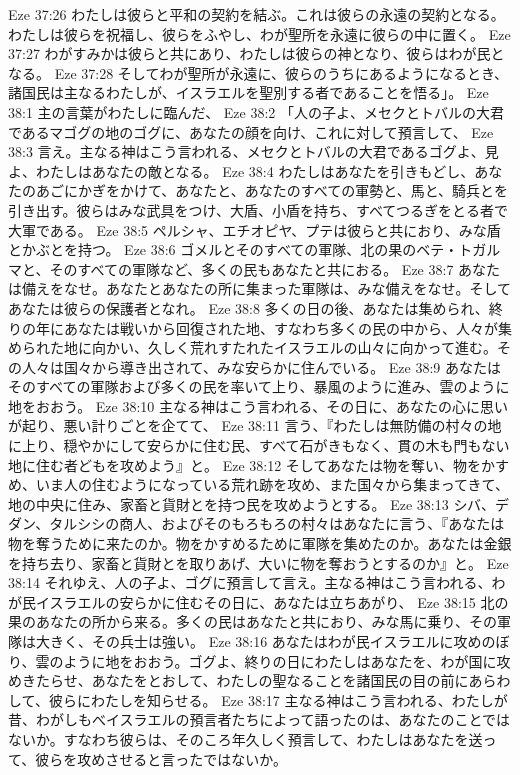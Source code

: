 Eze 37:26  わたしは彼らと平和の契約を結ぶ。これは彼らの永遠の契約となる。わたしは彼らを祝福し、彼らをふやし、わが聖所を永遠に彼らの中に置く。
Eze 37:27  わがすみかは彼らと共にあり、わたしは彼らの神となり、彼らはわが民となる。
Eze 37:28  そしてわが聖所が永遠に、彼らのうちにあるようになるとき、諸国民は主なるわたしが、イスラエルを聖別する者であることを悟る」。
Eze 38:1  主の言葉がわたしに臨んだ、
Eze 38:2  「人の子よ、メセクとトバルの大君であるマゴグの地のゴグに、あなたの顔を向け、これに対して預言して、
Eze 38:3  言え。主なる神はこう言われる、メセクとトバルの大君であるゴグよ、見よ、わたしはあなたの敵となる。
Eze 38:4  わたしはあなたを引きもどし、あなたのあごにかぎをかけて、あなたと、あなたのすべての軍勢と、馬と、騎兵とを引き出す。彼らはみな武具をつけ、大盾、小盾を持ち、すべてつるぎをとる者で大軍である。
Eze 38:5  ペルシャ、エチオピヤ、プテは彼らと共におり、みな盾とかぶとを持つ。
Eze 38:6  ゴメルとそのすべての軍隊、北の果のベテ・トガルマと、そのすべての軍隊など、多くの民もあなたと共におる。
Eze 38:7  あなたは備えをなせ。あなたとあなたの所に集まった軍隊は、みな備えをなせ。そしてあなたは彼らの保護者となれ。
Eze 38:8  多くの日の後、あなたは集められ、終りの年にあなたは戦いから回復された地、すなわち多くの民の中から、人々が集められた地に向かい、久しく荒れすたれたイスラエルの山々に向かって進む。その人々は国々から導き出されて、みな安らかに住んでいる。
Eze 38:9  あなたはそのすべての軍隊および多くの民を率いて上り、暴風のように進み、雲のように地をおおう。
Eze 38:10  主なる神はこう言われる、その日に、あなたの心に思いが起り、悪い計りごとを企てて、
Eze 38:11  言う、『わたしは無防備の村々の地に上り、穏やかにして安らかに住む民、すべて石がきもなく、貫の木も門もない地に住む者どもを攻めよう』と。
Eze 38:12  そしてあなたは物を奪い、物をかすめ、いま人の住むようになっている荒れ跡を攻め、また国々から集まってきて、地の中央に住み、家畜と貨財とを持つ民を攻めようとする。
Eze 38:13  シバ、デダン、タルシシの商人、およびそのもろもろの村々はあなたに言う、『あなたは物を奪うために来たのか。物をかすめるために軍隊を集めたのか。あなたは金銀を持ち去り、家畜と貨財とを取りあげ、大いに物を奪おうとするのか』と。
Eze 38:14  それゆえ、人の子よ、ゴグに預言して言え。主なる神はこう言われる、わが民イスラエルの安らかに住むその日に、あなたは立ちあがり、
Eze 38:15  北の果のあなたの所から来る。多くの民はあなたと共におり、みな馬に乗り、その軍隊は大きく、その兵士は強い。
Eze 38:16  あなたはわが民イスラエルに攻めのぼり、雲のように地をおおう。ゴグよ、終りの日にわたしはあなたを、わが国に攻めきたらせ、あなたをとおして、わたしの聖なることを諸国民の目の前にあらわして、彼らにわたしを知らせる。
Eze 38:17  主なる神はこう言われる、わたしが昔、わがしもべイスラエルの預言者たちによって語ったのは、あなたのことではないか。すなわち彼らは、そのころ年久しく預言して、わたしはあなたを送って、彼らを攻めさせると言ったではないか。
